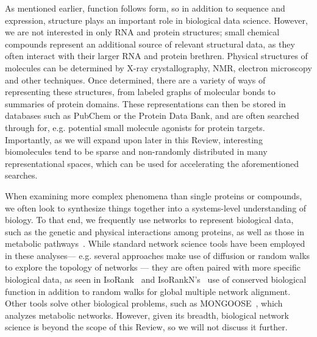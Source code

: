 \documentclass{acm_proc_article-sp}
\begin{document}
As mentioned earlier, function follows form, so in addition to
sequence and expression, structure plays an important role in biological data science.
However, we are not interested in only RNA and protein structures;
small chemical compounds represent an additional source of relevant structural data,
as they often interact with their larger RNA and protein brethren.
Physical structures of molecules can be determined by X-ray crystallography, NMR, electron microscopy and other 
techniques.
Once determined, there are a variety of ways of representing these structures, from labeled graphs of molecular bonds to summaries of protein domains.
These representations can then be stored in databases such as PubChem or the Protein Data Bank,
and are often searched through for, e.g. potential small molecule agonists for protein targets.
Importantly, as we will expand upon later in this Review, interesting biomolecules tend to be sparse and non-randomly distributed in many representational spaces, which can be used for accelerating the aforementioned searches.

When examining more complex phenomena than single proteins or compounds, we
often look to synthesize things together into a systems-level understanding of biology.
To that end, we frequently use
networks to represent biological data, such as the genetic
and physical interactions among proteins, as well as those in metabolic 
pathways~\cite{berger2013computational}.
While standard network science tools have been employed in these analyses---
e.g. several approaches make use of diffusion or random walks to explore the topology of networks \cite{cao2013going,cho2015diffusion}---
they are often paired with more specific biological data,
as seen in IsoRank~\cite{singh2008global} and IsoRankN's~\cite{liao2009isorankn} use of conserved biological function in addition to random walks for global multiple network alignment.
Other tools solve other biological problems, such as MONGOOSE~\cite{chindelevitch2014exact}, which 
analyzes metabolic networks.
However, given its breadth, biological network science is beyond the scope of this Review, so we will not discuss it further.

\end{document}
